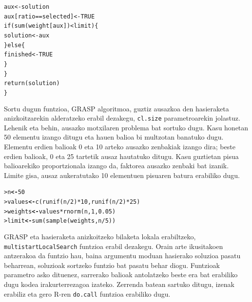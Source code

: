 \documentclass[eu]{ifirak}\usepackage[]{graphicx}\usepackage[]{color}
\makeatletter
\newcommand{\hlnum}[1]{\textcolor[rgb]{0.659,0.4,0.051}{#1}}%
\newcommand{\hlopt}[1]{\textcolor[rgb]{0,0,0}{#1}}%
\newcommand{\hlstd}[1]{\textcolor[rgb]{0,0,0}{#1}}%
\newcommand{\hlkwb}[1]{\textcolor[rgb]{0.549,0.114,0.412}{\textbf{#1}}}%
\newcommand{\hlkwd}[1]{\textcolor[rgb]{0.659,0.133,0.482}{#1}}%
\newenvironment{kframe}{%
 \def\at@end@of@kframe{}%
 \ifinner\ifhmode%
  \def\at@end@of@kframe{\end{minipage}}%
  \begin{minipage}{\columnwidth}%
 \fi\fi%
 \def\FrameCommand##1{\hskip\@totalleftmargin \hskip-\fboxsep
 \colorbox{shadecolor}{##1}\hskip-\fboxsep
     \hskip-\linewidth \hskip-\@totalleftmargin \hskip\columnwidth}%
 \MakeFramed {\advance\hsize-\width
   \@totalleftmargin\z@ \linewidth\hsize
   \@setminipage}}%
 {\par\unskip\endMakeFramed%
 \at@end@of@kframe}
\newenvironment{knitrout}{}{} %
\newcommand{\code}[1]{\texttt{#1}}
\makeatother
\begin{document}
\begin{knitrout}
\color{fgcolor}\begin{kframe}
\begin{alltt}
    aux <- solution
    aux[ratio == selected] <- TRUE
    \hlkwd{if} (\hlkwd{sum}(weight[aux]) < limit) \{
      solution <- aux
    \}else\{
      finished <- TRUE
    \}
  \}
  \hlkwd{return}(solution)
\}
\end{alltt}
\end{kframe}
\end{knitrout}

Sortu dugun funtzioa, GRASP algoritmoa, guztiz ausazkoa den hasieraketa anizkoitzarekin alderatzeko erabil dezakegu, \code{cl.size} parametroarekin jolastuz. Lehenik eta behin, ausazko motxilaren problema bat sortuko dugu. Kasu honetan 50 elementu izango ditugu eta hauen balioa bi multzotan banatuko dugu. Elementu erdien balioak 0 eta 10 arteko ausazko zenbakiak izango dira; beste erdien balioak, 0 eta 25 tartetik ausaz hautatuko ditugu. Kasu guztietan pisua balioarekiko proportzionala izango da, faktorea ausazko zenbaki bat izanik. Limite gisa, ausaz aukeratutako 10 elementuen pisuaren batura erabiliko dugu.

\begin{knitrout}
\color{fgcolor}\begin{kframe}
\begin{alltt}
\hlstd{> }\hlstd{n} \hlkwb{<-} \hlnum{50}
\hlstd{> }\hlstd{values}  \hlkwb{<-} \hlkwd{c}\hlstd{(}\hlkwd{runif}\hlstd{(n} \hlopt{/} \hlnum{2}\hlstd{)} \hlopt{*} \hlnum{10}\hlstd{,}  \hlkwd{runif}\hlstd{(n} \hlopt{/} \hlnum{2}\hlstd{)} \hlopt{*} \hlnum{25}\hlstd{)}
\hlstd{> }\hlstd{weights} \hlkwb{<-} \hlstd{values} \hlopt{*} \hlkwd{rnorm}\hlstd{(n,} \hlnum{1}\hlstd{,} \hlnum{0.05}\hlstd{)}
\hlstd{> }\hlstd{limit}   \hlkwb{<-} \hlkwd{sum}\hlstd{(}\hlkwd{sample}\hlstd{(weights, n} \hlopt{/} \hlnum{5}\hlstd{))}
\end{alltt}
\end{kframe}
\end{knitrout}

GRASP eta hasieraketa anizkoitzeko bilaketa lokala erabiltzeko, \code{multistartLocalSearch} funtzioa erabil dezakegu. Orain arte ikusitakoen antzerakoa da funtzio hau, baina argumentu moduan hasierako soluzioa pasatu beharrean, soluzioak sortzeko funtzio bat pasatu behar diogu. Funtzioak parametro asko dituenez, sarrerako balioak antolatzeko beste era bat erabiliko dugu kodea irakurterrezagoa izateko. Zerrenda batean sartuko ditugu, izenak erabiliz eta gero R-ren \code{do.call} funtzioa erabiliko dugu.
\end{document}

